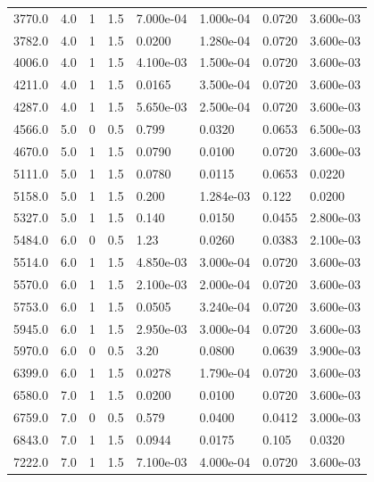 \documentclass[preview]{standalone}
\begin{document}
{{\begin{tabular}{L{1.2cm}C{1.2cm} C{0.3cm}C{0.5cm} C{1.4cm}C{1.4cm} C{1.4cm}C{1.4cm}}
  3770.0  &   4.0  & 1     & 1.5 &  7.000e-04  & 1.000e-04  & 0.0720 &  3.600e-03   \\ 
  3782.0  &   4.0  & 1     & 1.5 &  0.0200  & 1.280e-04  & 0.0720 &  3.600e-03   \\ 
  4006.0  &   4.0  & 1     & 1.5 &  4.100e-03  & 1.500e-04  & 0.0720 &  3.600e-03   \\ 
  4211.0  &   4.0  & 1     & 1.5 &  0.0165  & 3.500e-04  & 0.0720 &  3.600e-03   \\ 
  4287.0  &   4.0  & 1     & 1.5 &  5.650e-03  & 2.500e-04  & 0.0720 &  3.600e-03   \\ 
  4566.0  &   5.0  & 0     & 0.5 &  0.799  & 0.0320  & 0.0653 &  6.500e-03   \\ 
  4670.0  &   5.0  & 1     & 1.5 &  0.0790  & 0.0100  & 0.0720 &  3.600e-03   \\ 
  5111.0  &   5.0  & 1     & 1.5 &  0.0780  & 0.0115  & 0.0653 &  0.0220   \\ 
  5158.0  &   5.0  & 1     & 1.5 &  0.200  & 1.284e-03  & 0.122 &  0.0200   \\ 
  5327.0  &   5.0  & 1     & 1.5 &  0.140  & 0.0150  & 0.0455 &  2.800e-03   \\ 
  5484.0  &   6.0  & 0     & 0.5 &  1.23  & 0.0260  & 0.0383 &  2.100e-03   \\ 
  5514.0  &   6.0  & 1     & 1.5 &  4.850e-03  & 3.000e-04  & 0.0720 &  3.600e-03   \\ 
  5570.0  &   6.0  & 1     & 1.5 &  2.100e-03  & 2.000e-04  & 0.0720 &  3.600e-03   \\ 
  5753.0  &   6.0  & 1     & 1.5 &  0.0505  & 3.240e-04  & 0.0720 &  3.600e-03   \\ 
  5945.0  &   6.0  & 1     & 1.5 &  2.950e-03  & 3.000e-04  & 0.0720 &  3.600e-03   \\ 
  5970.0  &   6.0  & 0     & 0.5 &  3.20  & 0.0800  & 0.0639 &  3.900e-03   \\ 
  6399.0  &   6.0  & 1     & 1.5 &  0.0278  & 1.790e-04  & 0.0720 &  3.600e-03   \\ 
  6580.0  &   7.0  & 1     & 1.5 &  0.0200  & 0.0100  & 0.0720 &  3.600e-03   \\ 
  6759.0  &   7.0  & 0     & 0.5 &  0.579  & 0.0400  & 0.0412 &  3.000e-03   \\ 
  6843.0  &   7.0  & 1     & 1.5 &  0.0944  & 0.0175  & 0.105 &  0.0320   \\ 
  7222.0  &   7.0  & 1     & 1.5 &  7.100e-03  & 4.000e-04  & 0.0720 &  3.600e-03   \\ 

\end{tabular}}}
\end{document}
